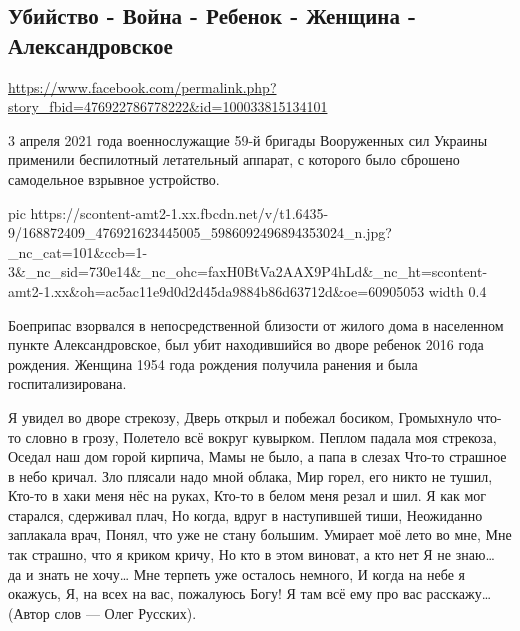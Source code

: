  
 
 
 
 

\subsection{Убийство - Война - Ребенок - Женщина - Александровское}
\label{sec:05_04_2021.fb.rostovcev_oleg.1.donbass_vojna_rebenok_smert}
\url{https://www.facebook.com/permalink.php?story_fbid=476922786778222&id=100033815134101}

3 апреля 2021 года военнослужащие 59-й бригады Вооруженных сил Украины
применили беспилотный летательный аппарат, с которого было сброшено самодельное
взрывное устройство.


\ifcmt
  pic https://scontent-amt2-1.xx.fbcdn.net/v/t1.6435-9/168872409_476921623445005_5986092496894353024_n.jpg?_nc_cat=101&ccb=1-3&_nc_sid=730e14&_nc_ohc=faxH0BtVa2AAX9P4hLd&_nc_ht=scontent-amt2-1.xx&oh=ac5ac11e9d0d2d45da9884b86d63712d&oe=60905053
  width 0.4
\fi


Боеприпас взорвался в непосредственной близости от жилого дома в населенном
пункте Александровское, был убит находившийся во дворе ребенок 2016 года
рождения. Женщина 1954 года рождения получила ранения и была госпитализирована.

Я увидел во дворе стрекозу,
Дверь открыл и побежал босиком,
Громыхнуло что-то словно в грозу,
Полетело всё вокруг кувырком.
Пеплом падала моя стрекоза,
Оседал наш дом горой кирпича,
Мамы не было, а папа в слезах
Что-то страшное в небо кричал.
Зло плясали надо мной облака,
Мир горел, его никто не тушил,
Кто-то в хаки меня нёс на руках,
Кто-то в белом меня резал и шил.
Я как мог старался, сдерживал плач,
Но когда, вдруг в наступившей тиши,
Неожиданно заплакала врач,
Понял, что уже не стану большим.
Умирает моё лето во мне,
Мне так страшно, что я криком кричу,
Но кто в этом виноват, а кто нет
Я не знаю… да и знать не хочу…
Мне терпеть уже осталось немного,
И когда на небе я окажусь,
Я, на всех на вас, пожалуюсь Богу!
Я там всё ему про вас расскажу…
(Автор слов — Олег Русских).

